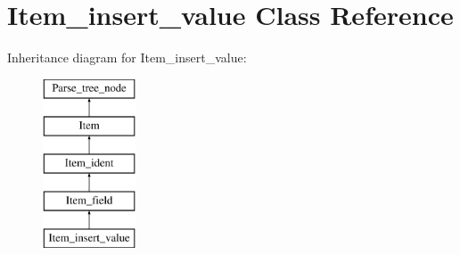 \hypertarget{classItem__insert__value}{}\section{Item\+\_\+insert\+\_\+value Class Reference}
\label{classItem__insert__value}
Inheritance diagram for Item\+\_\+insert\+\_\+value\+:\begin{figure}[H]
\begin{center}
\leavevmode
\includegraphics[height=5.000000cm]{classItem__insert__value}
\end{center}
\end{figure}
